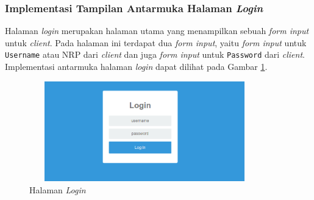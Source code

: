 \subsubsection{Implementasi Tampilan Antarmuka Halaman \textit{Login}}
Halaman \textit{login} merupakan halaman utama yang menampilkan sebuah \textit{form input} untuk \textit{client}. Pada halaman ini terdapat dua \textit{form input}, yaitu \textit{form input} untuk \texttt{Username} atau NRP dari \textit{client} dan juga \textit{form input} untuk \texttt{Password} dari \textit{client}. Implementasi antarmuka halaman \textit{login} dapat dilihat pada Gambar \ref{implementasihalamanlogin}.

\begin{figure}[H]
	\centering
	\includegraphics[width=10cm,height=4.35cm]{images/bab4/halamanlogin}
	\caption{Halaman \textit{Login}}
	\label{implementasihalamanlogin}
\end{figure}

